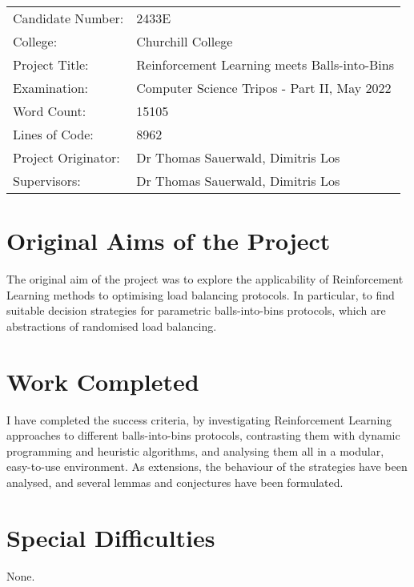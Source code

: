 
\begin{proforma}      


\begin{table}[h]
\begin{tabular}{ll}
Candidate Number:  & 2433E \\
College: & Churchill College \\
Project Title:    &  Reinforcement Learning meets Balls-into-Bins  \\
Examination:  & Computer Science Tripos - Part II, May 2022   \\
Word Count:  & 15105  \protect\footnotemark[1]\\
Lines of Code: & 8962 \protect\footnotemark[2] \\
Project Originator: & Dr Thomas Sauerwald, Dimitris Los \\
Supervisors: & Dr Thomas Sauerwald, Dimitris Los 
\end{tabular}
\end{table}




\section*{Original Aims of the Project}

The original aim of the project was to explore the applicability of Reinforcement Learning methods to optimising load balancing protocols. In particular, to find suitable decision strategies for parametric balls-into-bins protocols, which are abstractions of randomised load balancing.

\section*{Work Completed}

I have completed the success criteria, by investigating Reinforcement Learning approaches to different balls-into-bins protocols, contrasting them with dynamic programming and heuristic algorithms, and analysing them all in a modular, easy-to-use environment. As extensions, the behaviour of the strategies have been analysed, and several lemmas and conjectures have been formulated.

\section*{Special Difficulties}

None.

\end{proforma}
